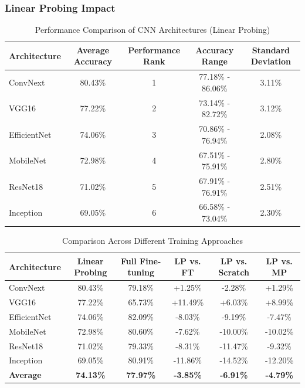 \documentclass[11pt]{article}
\begin{document}
\subsubsection{Linear Probing Impact}
\begin{table}[ht]
    \centering
    \begin{tabular}{lcccc}
    \toprule
    \textbf{Architecture} & \textbf{Average Accuracy} & \textbf{Performance Rank} & \textbf{Accuracy Range} & \textbf{Standard Deviation} \\
    \midrule
    ConvNext & 80.43\% & 1 & 77.18\% - 86.06\% & 3.11\% \\
    VGG16 & 77.22\% & 2 & 73.14\% - 82.72\% & 3.12\% \\
    EfficientNet & 74.06\% & 3 & 70.86\% - 76.94\% & 2.08\% \\
    MobileNet & 72.98\% & 4 & 67.51\% - 75.91\% & 2.80\% \\
    ResNet18 & 71.02\% & 5 & 67.91\% - 76.91\% & 2.51\% \\
    Inception & 69.05\% & 6 & 66.58\% - 73.04\% & 2.30\% \\
    \bottomrule
    \end{tabular}
    \caption{Performance Comparison of CNN Architectures (Linear Probing)}
    \label{tab:linear_probing}
\end{table}
\begin{table}[ht]
    \centering
    \small
    \begin{tabular}{lccccc}
    \toprule
    \textbf{Architecture} & \textbf{Linear Probing} & \textbf{Full Fine-tuning} & \textbf{LP vs. FT} & \textbf{LP vs. Scratch} & \textbf{LP vs. MP} \\
    \midrule
    ConvNext & 80.43\% & 79.18\% & +1.25\% & -2.28\% & +1.29\% \\
    VGG16 & 77.22\% & 65.73\% & +11.49\% & +6.03\% & +8.99\% \\
    EfficientNet & 74.06\% & 82.09\% & -8.03\% & -9.19\% & -7.47\% \\
    MobileNet & 72.98\% & 80.60\% & -7.62\% & -10.00\% & -10.02\% \\
    ResNet18 & 71.02\% & 79.33\% & -8.31\% & -11.47\% & -9.32\% \\
    Inception & 69.05\% & 80.91\% & -11.86\% & -14.52\% & -12.20\% \\
    \midrule
    \textbf{Average} & \textbf{74.13\%} & \textbf{77.97\%} & \textbf{-3.85\%} & \textbf{-6.91\%} & \textbf{-4.79\%} \\
    \bottomrule
    \end{tabular}
    \caption{Comparison Across Different Training Approaches\protect\footnotemark}
    \label{tab:training_comparison}
\end{table}
\end{document}
